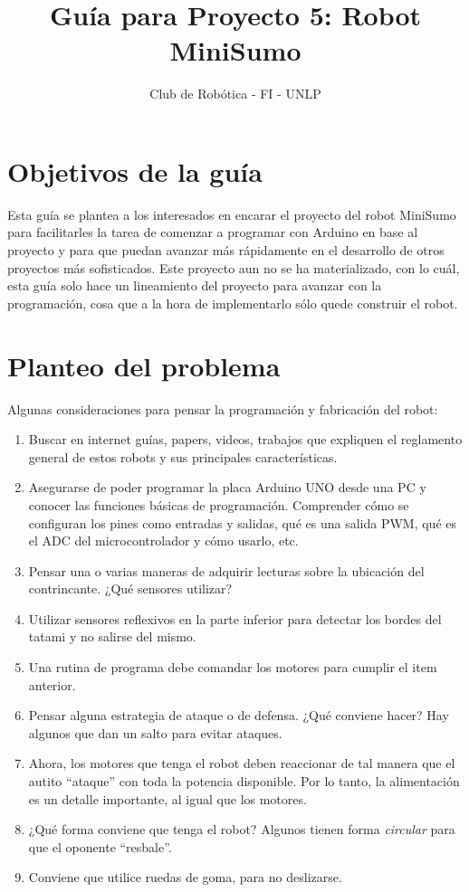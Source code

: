\documentclass[a4paper,10pt]{article}
\title{\Huge{\textbf{Guía para Proyecto 5: Robot MiniSumo}}}
\author{Club de Robótica - FI - UNLP}
\date{}
\begin{document}
\maketitle

\section{Objetivos de la guía}

Esta guía se plantea a los interesados en encarar el proyecto del robot MiniSumo para facilitarles la tarea de comenzar a programar con Arduino en base al proyecto y para que puedan avanzar más rápidamente en el desarrollo de otros proyectos más sofisticados.
Este proyecto aun no se ha materializado, con lo cuál, esta guía solo hace un lineamiento del proyecto para avanzar con la programación, cosa que a la hora de implementarlo sólo quede construir el robot.

\section{Planteo del problema}

Algunas consideraciones para pensar la programación y fabricación del robot:

\begin{enumerate}
	\item Buscar en internet guías, papers, videos, trabajos que expliquen el reglamento general de estos robots y sus principales características.
	\item Asegurarse de poder programar la placa Arduino UNO desde una PC y conocer las funciones básicas de programación. Comprender cómo se configuran los pines como entradas y salidas, qué es una salida PWM, qué es el ADC del microcontrolador y cómo usarlo, etc.
	\item Pensar una o varias maneras de adquirir lecturas sobre la ubicación del contrincante. ¿Qué sensores utilizar?
	\item Utilizar sensores reflexivos en la parte inferior para detectar los bordes del tatami y no salirse del mismo.
	\item Una rutina de programa debe comandar los motores para cumplir el item anterior.
	\item Pensar alguna estrategia de ataque o de defensa. ¿Qué conviene hacer? Hay algunos que dan un salto para evitar ataques.
	\item Ahora, los motores que tenga el robot deben reaccionar de tal manera que el autito ``ataque'' con toda la potencia disponible. Por lo tanto, la alimentación es un detalle importante, al igual que los motores.
	\item ¿Qué forma conviene que tenga el robot? Algunos tienen forma \textit{circular} para que el oponente ``resbale''. 
	\item Conviene que utilice ruedas de goma, para no deslizarse.
	
\end{enumerate}
\end{document}
